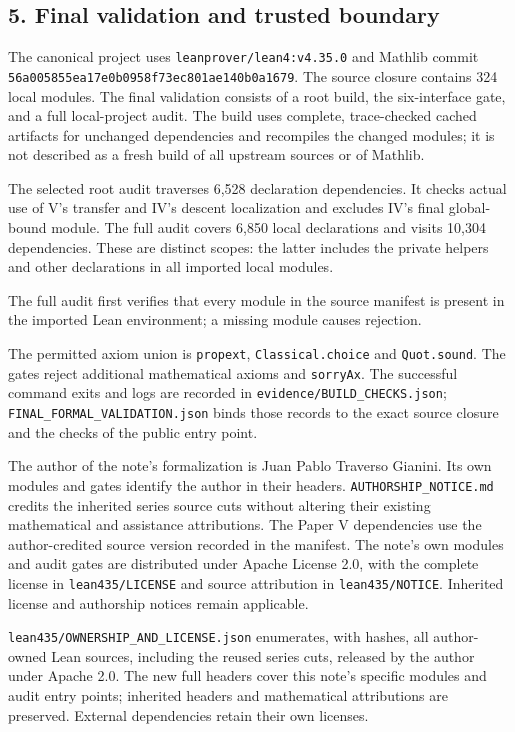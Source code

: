 \documentclass[english,11pt,a4paper]{article}
\begin{document}
\subsection{5. Final validation and trusted
boundary}\label{final-validation-and-trusted-boundary}

The canonical project uses \nolinkurl{leanprover/lean4:v4.35.0} and Mathlib
commit \nolinkurl{56a005855ea17e0b0958f73ec801ae140b0a1679}. The source
closure contains 324 local modules. The final validation consists of a
root build, the six-interface gate, and a full local-project audit. The
build uses complete, trace-checked cached artifacts for unchanged
dependencies and recompiles the changed modules; it is not described as
a fresh build of all upstream sources or of Mathlib.

The selected root audit traverses 6,528 declaration dependencies. It
checks actual use of V's transfer and IV's descent localization and
excludes IV's final global-bound module. The full audit covers 6,850
local declarations and visits 10,304 dependencies. These are distinct
scopes: the latter includes the private helpers and other declarations
in all imported local modules.

The full audit first verifies that every module in the source manifest
is present in the imported Lean environment; a missing module causes
rejection.

The permitted axiom union is \nolinkurl{propext}, \nolinkurl{Classical.choice}
and \nolinkurl{Quot.sound}. The gates reject additional mathematical axioms
and \nolinkurl{sorryAx}. The successful command exits and logs are recorded
in \nolinkurl{evidence/BUILD_CHECKS.json};
\nolinkurl{FINAL_FORMAL_VALIDATION.json} binds those records to the exact
source closure and the checks of the public entry point.

The author of the note's formalization is Juan Pablo Traverso Gianini.
Its own modules and gates identify the author in their headers.
\nolinkurl{AUTHORSHIP_NOTICE.md} credits the inherited series source cuts
without altering their existing mathematical and assistance
attributions. The Paper V dependencies use the author-credited source
version recorded in the manifest. The note's own modules and audit gates
are distributed under Apache License 2.0, with the complete license in
\nolinkurl{lean435/LICENSE} and source attribution in
\nolinkurl{lean435/NOTICE}. Inherited license and authorship notices remain
applicable.

\nolinkurl{lean435/OWNERSHIP_AND_LICENSE.json} enumerates, with hashes,
all author-owned Lean sources, including the reused series cuts,
released by the author under Apache 2.0. The new full headers cover this
note's specific modules and audit entry points; inherited headers and
mathematical attributions are preserved. External dependencies retain
their own licenses.
\end{document}

